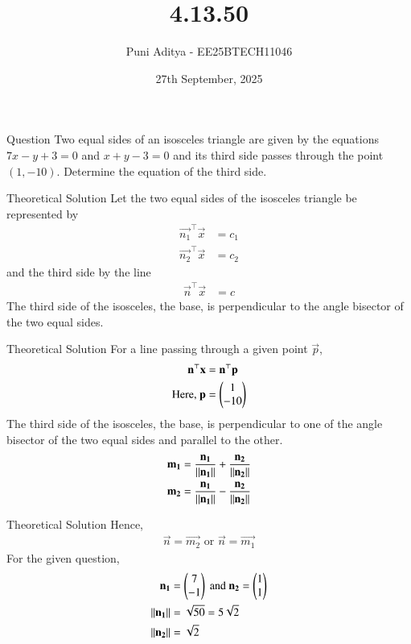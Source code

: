 \documentclass{beamer}
\title{4.13.50}
\date{27th September, 2025}
\author{Puni Aditya - EE25BTECH11046}
\begin{document}
\frame{\titlepage}
\begin{frame}{Question}
Two equal sides of an isosceles triangle are given by the equations $7x - y + 3 = 0$ and $x + y - 3 = 0$ and its third side passes through the point $(1, -10)$. Determine the equation of the third side.
\end{frame}

\begin{frame}{Theoretical Solution}
Let the two equal sides of the isosceles triangle be represented by
\begin{align*}
    \vec{n_1}^\top\vec{x} &= c_1 \\
    \vec{n_2}^\top\vec{x} &= c_2
\end{align*}
and the third side by the line
\begin{align*}
    \vec{n}^\top\vec{x} &= c
\end{align*}
The third side of the isosceles, the base, is perpendicular to the angle bisector of the two equal sides.
\end{frame}

\begin{frame}{Theoretical Solution}
For a line passing through a given point $\vec{p}$,
\begin{align}
	\mathbf{n}^\top\mathbf{x} &= \mathbf{n}^\top\mathbf{p} \\
    \text{Here, }\mathbf{p} &= \begin{pmatrix}1 \\ -10\end{pmatrix}
\end{align}
The third side of the isosceles, the base, is perpendicular to one of the angle bisector of the two equal sides and parallel to the other.
\begin{align}
    \mathbf{m_1} &= \frac{\mathbf{n_1}}{\left\lVert\mathbf{n_1}\right\rVert} + \frac{\mathbf{n_2}}{\left\lVert\mathbf{n_2}\right\rVert} \label{eq:31} \\
    \mathbf{m_2} &= \frac{\mathbf{n_1}}{\left\lVert\mathbf{n_1}\right\rVert} - \frac{\mathbf{n_2}}{\left\lVert\mathbf{n_2}\right\rVert} \label{eq:32}
\end{align}
\end{frame}

\begin{frame}{Theoretical Solution}
Hence,
\begin{align}
	\vec{n} = \vec{m_2}\text{ or }\vec{n} = \vec{m_1}
\end{align}
For the given question,
\begin{align}
    \mathbf{n_1} &= \begin{pmatrix}7 \\ -1\end{pmatrix}\text{ and }\mathbf{n_2} = \begin{pmatrix}1 \\ 1\end{pmatrix} \\
    \left\lVert\mathbf{n_1}\right\rVert &= \sqrt{50} = 5\sqrt{2} \\
    \left\lVert\mathbf{n_2}\right\rVert &= \sqrt{2}
\end{align}
\end{frame}
\end{document}
